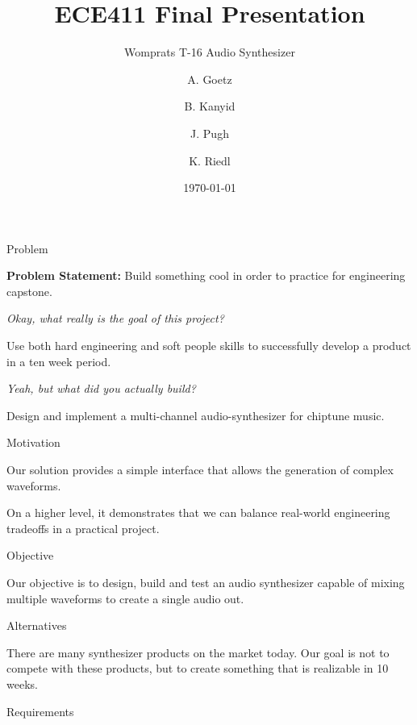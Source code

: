 \documentclass{beamer}
\title{ECE411 Final Presentation}
\subtitle{Womprats T-16 Audio Synthesizer}
\author{A. Goetz \and B. Kanyid \and J. Pugh \and K. Riedl}
\institute[PSU]{
  Maseeh College of Engineering and Computer Science\\
  Portland State University\\
  Portland, Oregon 97207  
}
\date{\today}
\begin{document}
\begin{frame}[plain]
  \titlepage
\end{frame}



\begin{frame}{Problem}

  \textbf{Problem Statement:}  \pause Build something cool in order to
  practice for engineering capstone. 

  \pause \textit{Okay, what really is the goal of this project?}

  \pause Use both hard engineering and soft people skills to
  successfully develop a product in a ten week period. 
  
  \pause \textit{Yeah, but what did you actually build?}

  \pause Design and implement a multi-channel audio-synthesizer for
  chiptune music.

  
\end{frame}

\begin{frame}{Motivation}

  Our solution provides a simple interface that allows the generation
  of complex waveforms. 

  On a higher level, it demonstrates that we can balance real-world
  engineering tradeoffs in a practical project. 

\end{frame}

\begin{frame}{Objective}

  Our objective is to design, build and test an audio synthesizer
  capable of mixing multiple waveforms to create a single audio out. 
\end{frame}

\begin{frame}{Alternatives}

There are many synthesizer products on the market today. Our goal is
not to compete with these products, but to create something that is realizable in 10 weeks. 
\end{frame}

\begin{frame}{Requirements}

\end{frame}
\end{document}
